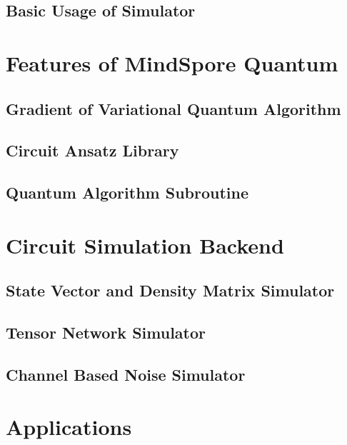 \documentclass[pra,twocolumn,superscriptaddress,floatfix,nofootinbib,amsmath,amssymb]{revtex4-1}
\begin{document}
\subsection{Basic Usage of Simulator}



\section{Features of MindSpore Quantum}

\subsection{Gradient of Variational Quantum Algorithm}


\subsection{Circuit Ansatz Library}


\subsection{Quantum Algorithm Subroutine}



\section{Circuit Simulation Backend}

\subsection{State Vector and Density Matrix Simulator}


\subsection{Tensor Network Simulator}


\subsection{Channel Based Noise Simulator}



\section{Applications}
\end{document}
